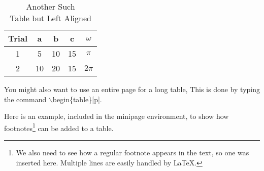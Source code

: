 \begin{table}[hbt]
 \caption[
   Another such table but left aligned.]{
   Another Such\\Table but Left Aligned\label{ltab}}
 \begin{tabular}{|c||c|c|c|c||}    \hline
  Trial &	a  &  b & c & $\omega$ \\ \hline \hline
  1 & 5 & 10  & 15 & $\pi$ \\ \hline
  2 & 10 & 20  & 15 & $2\pi$ \\ \hline
 \end{tabular}
\end{table}


You might also want to use an entire page for a long table,
This is done by typing the command $\backslash$begin\{table\}[p]. 

Here is an example, included in the minipage environment, to show how 
footnotes\footnote{We also need to see how a regular footnote
appears in the text, so one was inserted here. Multiple lines are easily
handled by \LaTeX.}
can be added to a table.
